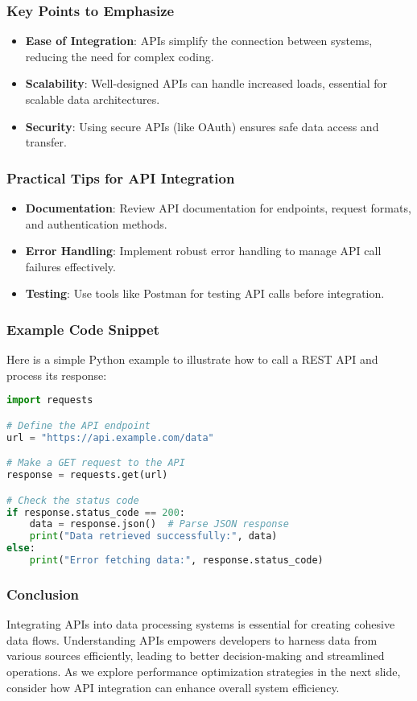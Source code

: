\documentclass[aspectratio=169]{beamer}
\begin{document}
\begin{frame}
    \frametitle{Key Points to Emphasize}
    \begin{itemize}
        \item \textbf{Ease of Integration}: APIs simplify the connection between systems, reducing the need for complex coding.
        \item \textbf{Scalability}: Well-designed APIs can handle increased loads, essential for scalable data architectures.
        \item \textbf{Security}: Using secure APIs (like OAuth) ensures safe data access and transfer.
    \end{itemize}
\end{frame}

\begin{frame}[fragile]
    \frametitle{Practical Tips for API Integration}
    \begin{itemize}
        \item \textbf{Documentation}: Review API documentation for endpoints, request formats, and authentication methods.
        \item \textbf{Error Handling}: Implement robust error handling to manage API call failures effectively.
        \item \textbf{Testing}: Use tools like Postman for testing API calls before integration.
    \end{itemize}
\end{frame}

\begin{frame}[fragile]
    \frametitle{Example Code Snippet}
    Here is a simple Python example to illustrate how to call a REST API and process its response:
    \begin{lstlisting}[language=Python]
import requests

# Define the API endpoint
url = "https://api.example.com/data"

# Make a GET request to the API
response = requests.get(url)

# Check the status code
if response.status_code == 200:
    data = response.json()  # Parse JSON response
    print("Data retrieved successfully:", data)
else:
    print("Error fetching data:", response.status_code)
    \end{lstlisting}
\end{frame}

\begin{frame}
    \frametitle{Conclusion}
    Integrating APIs into data processing systems is essential for creating cohesive data flows. Understanding APIs empowers developers to harness data from various sources efficiently, leading to better decision-making and streamlined operations. As we explore performance optimization strategies in the next slide, consider how API integration can enhance overall system efficiency.
\end{frame}
\end{document}
